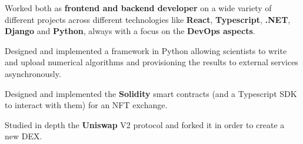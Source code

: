 \documentclass[]{cv}
\begin{document}
\begin{minipage}[t]{0.75\textwidth}
\begin{tightemize}
\item Worked both as \textbf{frontend and backend developer} on a wide variety of different projects across different technologies like \textbf{React}, \textbf{Typescript}, \textbf{.NET}, \textbf{Django} and \textbf{Python}, always with a focus on the \textbf{DevOps aspects}.
\item Designed and implemented a framework in Python allowing scientists to write and upload numerical algorithms and provisioning the results to external services asynchronously.
\item Designed and implemented the \textbf{Solidity} smart contracts (and a Typescript SDK to interact with them) for an NFT exchange.
\item Studied in depth the \textbf{Uniswap} V2 protocol and forked it in order to create a new DEX.
\end{tightemize}
\sectionsep



\end{minipage}
\end{document}
